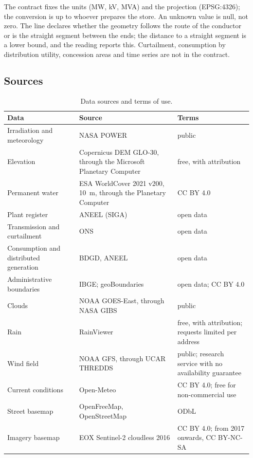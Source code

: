 \documentclass[10pt,a4paper,oneside]{article}
\begin{document}
The contract fixes the units (MW, kV, MVA) and the projection (EPSG:4326);
the conversion is up to whoever prepares the store. An unknown value is null,
not zero. The line declares whether the geometry follows the route of the
conductor or is the straight segment between the ends; the distance to a
straight segment is a lower bound, and the reading reports this. Curtailment,
consumption by distribution utility, concession areas and time series are not
in the contract.

\subsection{Sources}

\begin{table}[H]
\begin{tabelalarga}
\caption{Data sources and terms of use.}
\small
\begin{tabularx}{\linewidth}{L{42mm} Y L{52mm}}
\toprule
\textbf{Data} & \textbf{Source} & \textbf{Terms} \\
\midrule
Irradiation and meteorology & NASA POWER & public \\
Elevation & Copernicus DEM GLO-30, through the Microsoft Planetary Computer &
  free, with attribution \\
Permanent water & ESA WorldCover 2021 v200, \qty{10}{\metre}, through the
  Planetary Computer & CC BY 4.0 \\
Plant register & ANEEL (SIGA) & open data \\
Transmission and curtailment & ONS & open data \\
Consumption and distributed generation & BDGD, ANEEL & open data \\
Administrative boundaries & IBGE; geoBoundaries & open data; CC BY 4.0 \\
Clouds & NOAA GOES-East, through NASA GIBS & public \\
Rain & RainViewer & free, with attribution; requests limited per address \\
Wind field & NOAA GFS, through UCAR THREDDS & public; research service with
  no availability guarantee \\
Current conditions & Open-Meteo & CC BY 4.0; free for non-commercial use \\
Street basemap & OpenFreeMap, OpenStreetMap & ODbL \\
Imagery basemap & EOX Sentinel-2 cloudless 2016 & CC BY 4.0; from 2017
  onwards, CC BY-NC-SA \\
\bottomrule
\end{tabularx}
\end{tabelalarga}
\end{table}
\end{document}
